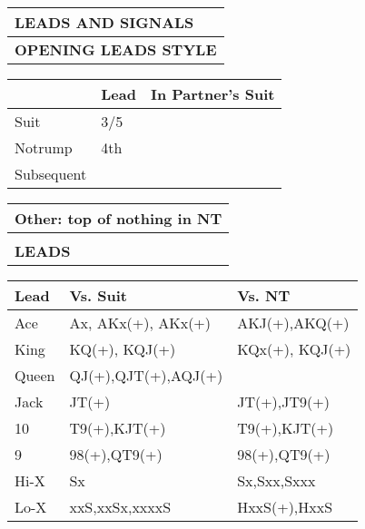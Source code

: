 \documentclass{article}
\begin{document}
\begin{minipage}{90mm}
	\begin{tabular}{| p{88mm} |}
		\hline
		\cellcolor[gray]{0.9} \textbf{LEADS AND SIGNALS} \\ \hline
		\textbf{OPENING LEADS STYLE} \\ \hline
	\end{tabular}
	\begin{tabular}{| p{15.25mm} | p{32mm} | p{32mm} |}
		& Lead & In Partner's Suit \\ \hline
		Suit       &3/5 & \\ \hline
		Notrump    &4th & \\ \hline
		Subsequent & & \\ \hline
	\end{tabular}
	\begin{tabular}{| p{88mm} |}
		Other: top of nothing in NT \\ \hline
		\\ \hline
		\textbf{LEADS} \\ \hline
	\end{tabular}
	\begin{tabular}{| p{11.25mm} | p{34mm} | p{34mm} |}
		Lead   & Vs. Suit            & Vs. NT \\ \hline
                Ace    &Ax, AKx(+), AKx(+)   & AKJ(+),AKQ(+) \\ \hline
                King   &KQ(+), KQJ(+)        &KQx(+), KQJ(+) \\ \hline
                Queen  &QJ(+),QJT(+),AQJ(+)  & \\ \hline
                Jack   &JT(+)                & JT(+),JT9(+) \\ \hline
                10     &T9(+),KJT(+)         & T9(+),KJT(+) \\ \hline
                9      &98(+),QT9(+)         & 98(+),QT9(+) \\ \hline

                Hi-X   & Sx                  &Sx,Sxx,Sxxx \\ \hline
                Lo-X   &xxS,xxSx,xxxxS       & HxxS(+),HxxS\\ \hline
	\end{tabular}
	\begin{tabular}{| p{88mm} |}


\end{tabular}
\end{minipage}
\end{document}

